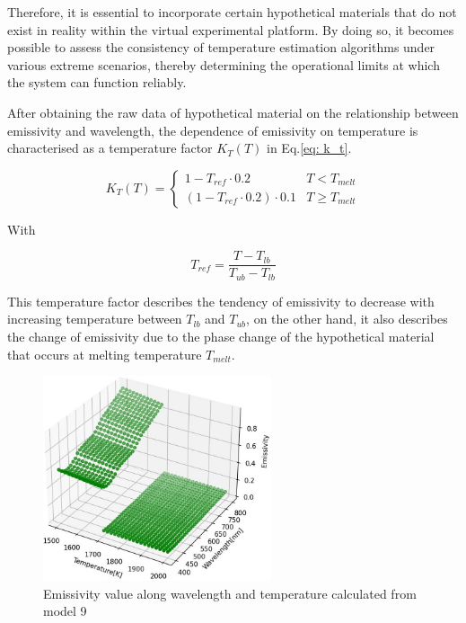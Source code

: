 Therefore, it is essential to incorporate certain hypothetical materials 
that do not exist in reality within the virtual experimental platform. 
By doing so, it becomes possible to assess the consistency of temperature 
estimation algorithms under various extreme scenarios, thereby determining 
the operational limits at which the system can function reliably.


After obtaining the raw data of hypothetical material on the relationship between emissivity 
and wavelength, the dependence of emissivity on temperature is characterised
as a temperature factor $K_T(T)$ in Eq.\ref{eq: k_t}.

\begin{equation}
  \label{eq: k_t}
  K_T(T)=\begin{cases}
    1 - T_{ref} \cdot 0.2 &   T<T_{melt}\\
    \left(1 - T_{ref} \cdot 0.2 \right) \cdot 0.1 &  T\geq T_{melt}
  \end{cases}
\end{equation}


With 

\begin{equation}
  \label{eq: t_ref}
  T_{ref}=\frac{T - T_{lb}}{T_{ub} - T_{lb}}
\end{equation}


This temperature factor describes the tendency 
of emissivity to decrease with increasing temperature between $T_{lb}$ and $T_{ub}$, 
on the other hand, it also describes the change of emissivity due to the 
phase change of the hypothetical material that occurs at melting 
temperature $T_{melt}$.

\begin{figure}[htbp]
  \centering
  \includegraphics[width=0.6\textwidth]{figures/emissivity_model.jpg}
  \caption{Emissivity value along wavelength and temperature calculated from model 9}
  \label{fig: emissivity_model}
\end{figure}


